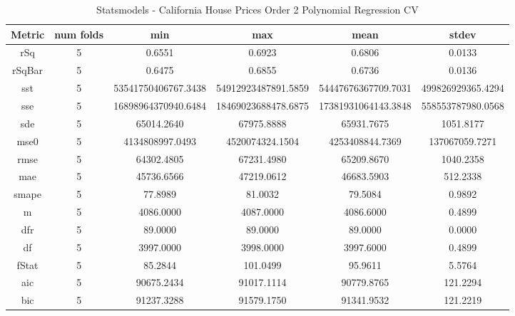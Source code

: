 \documentclass{article}
\begin{document}
\begin{table}[H]
\centering
\caption{Statsmodels - California House Prices Order 2 Polynomial Regression CV}
\label{tab:Statsmodels - House Prices Order 2 Polynomial Regression CV}
\begin{tabular}{|c|c|c|c|c|c|}\hline
Metric & num folds & min & max & mean & stdev \\ \hline \hline
rSq & 5 & 0.6551 & 0.6923 & 0.6806 & 0.0133 \\ \hline
rSqBar & 5 & 0.6475 & 0.6855 & 0.6736 & 0.0136 \\ \hline
sst & 5 & 53541750406767.3438 & 54912923487891.5859 & 54447676367709.7031 & 499826929365.4294 \\ \hline
sse & 5 & 16898964370940.6484 & 18469023688478.6875 & 17381931064143.3848 & 558553787980.0568 \\ \hline
sde & 5 & 65014.2640 & 67975.8888 & 65931.7675 & 1051.8177 \\ \hline
mse0 & 5 & 4134808997.0493 & 4520074324.1504 & 4253408844.7369 & 137067059.7271 \\ \hline
rmse & 5 & 64302.4805 & 67231.4980 & 65209.8670 & 1040.2358 \\ \hline
mae & 5 & 45736.6566 & 47219.0612 & 46683.5903 & 512.2338 \\ \hline
smape & 5 & 77.8989 & 81.0032 & 79.5084 & 0.9892 \\ \hline
m & 5 & 4086.0000 & 4087.0000 & 4086.6000 & 0.4899 \\ \hline
dfr & 5 & 89.0000 & 89.0000 & 89.0000 & 0.0000 \\ \hline
df & 5 & 3997.0000 & 3998.0000 & 3997.6000 & 0.4899 \\ \hline
fStat & 5 & 85.2844 & 101.0499 & 95.9611 & 5.5764 \\ \hline
aic & 5 & 90675.2434 & 91017.1114 & 90779.8765 & 121.2294 \\ \hline
bic & 5 & 91237.3288 & 91579.1750 & 91341.9532 & 121.2219 \\ \hline
\end{tabular}
\end{table}
\end{document}
